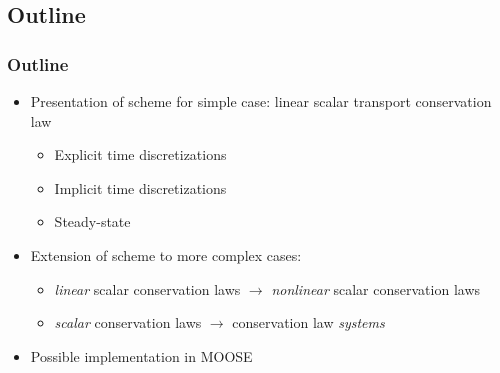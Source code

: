 \documentclass{beamer}
\begin{document}
\subsection{Outline}
\begin{frame}
\frametitle{Outline}

\begin{itemize}
   \item Presentation of scheme for simple case: linear scalar transport conservation law
   \begin{itemize}
      \item Explicit time discretizations
      \item Implicit time discretizations
      \item Steady-state
   \end{itemize}
   \item Extension of scheme to more complex cases:
   \begin{itemize}
      \item \emph{linear} scalar conservation laws $\rightarrow$ \emph{nonlinear} scalar conservation laws
      \item \emph{scalar} conservation laws $\rightarrow$ conservation law \emph{systems}
   \end{itemize}
   \item Possible implementation in MOOSE
\end{itemize}

\end{frame}
\end{document}
